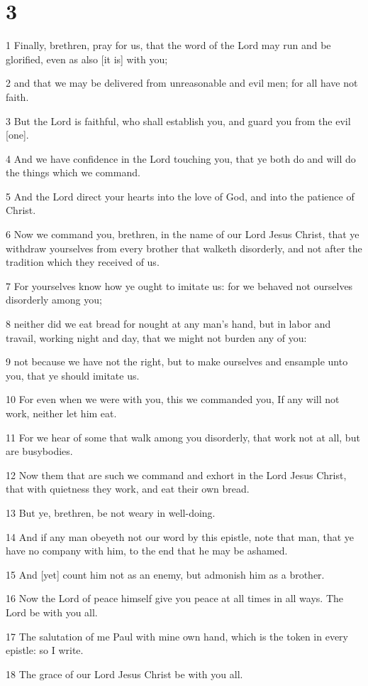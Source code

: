 \chapter{3}

\par 1 Finally, brethren, pray for us, that the word of the Lord may run and be glorified, even as also [it is] with you;
\par 2 and that we may be delivered from unreasonable and evil men; for all have not faith.
\par 3 But the Lord is faithful, who shall establish you, and guard you from the evil [one].
\par 4 And we have confidence in the Lord touching you, that ye both do and will do the things which we command.
\par 5 And the Lord direct your hearts into the love of God, and into the patience of Christ.
\par 6 Now we command you, brethren, in the name of our Lord Jesus Christ, that ye withdraw yourselves from every brother that walketh disorderly, and not after the tradition which they received of us.
\par 7 For yourselves know how ye ought to imitate us: for we behaved not ourselves disorderly among you;
\par 8 neither did we eat bread for nought at any man's hand, but in labor and travail, working night and day, that we might not burden any of you:
\par 9 not because we have not the right, but to make ourselves and ensample unto you, that ye should imitate us.
\par 10 For even when we were with you, this we commanded you, If any will not work, neither let him eat.
\par 11 For we hear of some that walk among you disorderly, that work not at all, but are busybodies.
\par 12 Now them that are such we command and exhort in the Lord Jesus Christ, that with quietness they work, and eat their own bread.
\par 13 But ye, brethren, be not weary in well-doing.
\par 14 And if any man obeyeth not our word by this epistle, note that man, that ye have no company with him, to the end that he may be ashamed.
\par 15 And [yet] count him not as an enemy, but admonish him as a brother.
\par 16 Now the Lord of peace himself give you peace at all times in all ways. The Lord be with you all.
\par 17 The salutation of me Paul with mine own hand, which is the token in every epistle: so I write.
\par 18 The grace of our Lord Jesus Christ be with you all.

